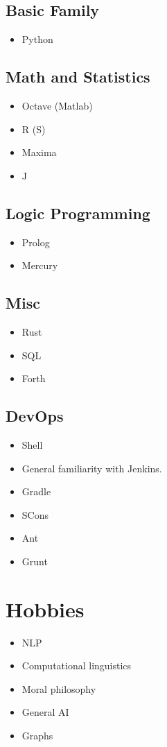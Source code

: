 \documentclass[11pt]{article}
\begin{document}
\subsection{Basic Family}
\label{sec-3-4}
\begin{itemize}
\item Python
\end{itemize}
\subsection{Math and Statistics}
\label{sec-3-5}
\begin{itemize}
\item Octave (Matlab)
\item R (S)
\item Maxima
\item J
\end{itemize}
\subsection{Logic Programming}
\label{sec-3-6}
\begin{itemize}
\item Prolog
\item Mercury
\end{itemize}
\subsection{Misc}
\label{sec-3-7}
\begin{itemize}
\item Rust
\item SQL
\item Forth
\end{itemize}
\subsection{DevOps}
\label{sec-3-8}
\begin{itemize}
\item Shell
\item General familiarity with Jenkins.
\item Gradle
\item SCons
\item Ant
\item Grunt
\end{itemize}
\section{Hobbies}
\label{sec-4}
\begin{itemize}
\item NLP
\item Computational linguistics
\item Moral philosophy
\item General AI
\item Graphs
\end{itemize}
\end{document}
